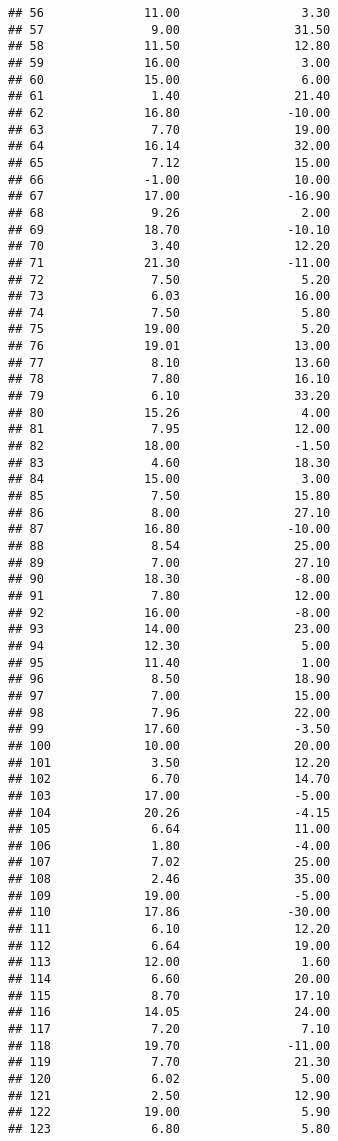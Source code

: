 \documentclass[
]{book}
\begin{document}
\begin{verbatim}
## 56              11.00                 3.30
## 57               9.00                31.50
## 58              11.50                12.80
## 59              16.00                 3.00
## 60              15.00                 6.00
## 61               1.40                21.40
## 62              16.80               -10.00
## 63               7.70                19.00
## 64              16.14                32.00
## 65               7.12                15.00
## 66              -1.00                10.00
## 67              17.00               -16.90
## 68               9.26                 2.00
## 69              18.70               -10.10
## 70               3.40                12.20
## 71              21.30               -11.00
## 72               7.50                 5.20
## 73               6.03                16.00
## 74               7.50                 5.80
## 75              19.00                 5.20
## 76              19.01                13.00
## 77               8.10                13.60
## 78               7.80                16.10
## 79               6.10                33.20
## 80              15.26                 4.00
## 81               7.95                12.00
## 82              18.00                -1.50
## 83               4.60                18.30
## 84              15.00                 3.00
## 85               7.50                15.80
## 86               8.00                27.10
## 87              16.80               -10.00
## 88               8.54                25.00
## 89               7.00                27.10
## 90              18.30                -8.00
## 91               7.80                12.00
## 92              16.00                -8.00
## 93              14.00                23.00
## 94              12.30                 5.00
## 95              11.40                 1.00
## 96               8.50                18.90
## 97               7.00                15.00
## 98               7.96                22.00
## 99              17.60                -3.50
## 100             10.00                20.00
## 101              3.50                12.20
## 102              6.70                14.70
## 103             17.00                -5.00
## 104             20.26                -4.15
## 105              6.64                11.00
## 106              1.80                -4.00
## 107              7.02                25.00
## 108              2.46                35.00
## 109             19.00                -5.00
## 110             17.86               -30.00
## 111              6.10                12.20
## 112              6.64                19.00
## 113             12.00                 1.60
## 114              6.60                20.00
## 115              8.70                17.10
## 116             14.05                24.00
## 117              7.20                 7.10
## 118             19.70               -11.00
## 119              7.70                21.30
## 120              6.02                 5.00
## 121              2.50                12.90
## 122             19.00                 5.90
## 123              6.80                 5.80
\end{verbatim}
\end{document}
